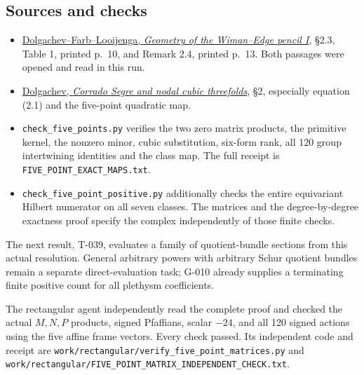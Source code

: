 \documentclass[
  10pt,
]{article}
\providecommand{\tightlist}{%
  \setlength{\itemsep}{0pt}\setlength{\parskip}{0pt}}
\providecommand{\tightlist}{\setlength{\itemsep}{0pt}\setlength{\parskip}{0pt}}
\begin{document}
\subsection{Sources and checks}\label{sources-and-checks}

\begin{itemize}
\tightlist
\item
  \href{https://www.math.uchicago.edu/~farb/papers/wiman.pdf}{Dolgachev--Farb--Looijenga,
  \emph{Geometry of the Wiman--Edge pencil I}}, §2.3, Table 1, printed
  p.~10, and Remark 2.4, printed p.~13. Both passages were opened and
  read in this run.
\item
  \href{https://sites.lsa.umich.edu/idolga-new/wp-content/uploads/sites/1467/2024/08/segre15.pdf}{Dolgachev,
  \emph{Corrado Segre and nodal cubic threefolds}}, §2, especially
  equation (2.1) and the five-point quadratic map.
\item
  \texttt{\small check\_\allowbreak{}five\_\allowbreak{}points.py}
  verifies the two zero matrix products, the primitive kernel, the
  nonzero minor, cubic substitution, six-form rank, all 120 group
  intertwining identities and the class map. The full receipt is
  \texttt{\small FIVE\_\allowbreak{}POINT\_\allowbreak{}EXACT\_\allowbreak{}MAPS.txt}.
\item
  \texttt{\small check\_\allowbreak{}five\_\allowbreak{}point\_\allowbreak{}positive.py}
  additionally checks the entire equivariant Hilbert numerator on all
  seven classes. The matrices and the degree-by-degree exactness proof
  specify the complex independently of those finite checks.
\end{itemize}

The next result, T-039, evaluates a family of quotient-bundle sections
from this actual resolution. General arbitrary powers with arbitrary
Schur quotient bundles remain a separate direct-evaluation task; G-010
already supplies a terminating finite positive count for all plethysm
coefficients.

The rectangular agent independently read the complete proof and checked
the actual \(M,N,P\) products, signed Pfaffians, scalar \(-24\), and all
120 signed actions using the five affine frame vectors. Every check
passed. Its independent code and receipt are
\texttt{\small work/\allowbreak{}rectangular/\allowbreak{}verify\_\allowbreak{}five\_\allowbreak{}point\_\allowbreak{}matrices.py}
and
\texttt{\small work/\allowbreak{}rectangular/\allowbreak{}FIVE\_\allowbreak{}POINT\_\allowbreak{}MATRIX\_\allowbreak{}INDEPENDENT\_\allowbreak{}CHECK.txt}.
\end{document}
